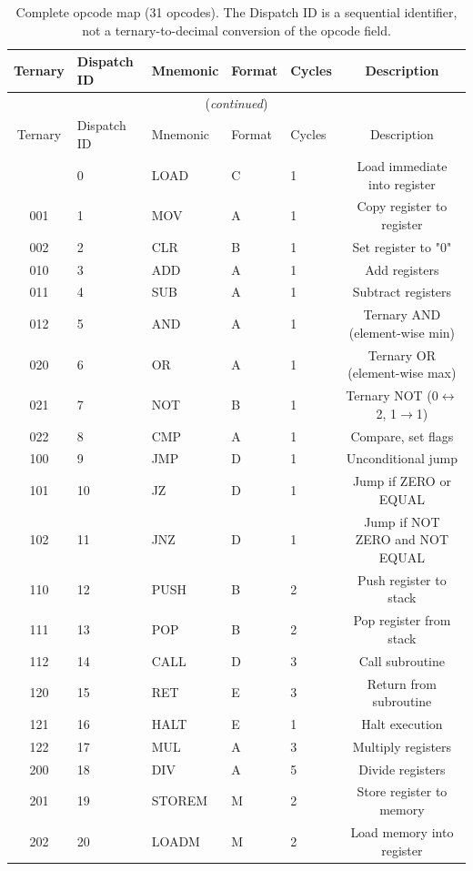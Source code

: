 \documentclass[12pt,a4paper,twoside]{book}
\theoremstyle{trinarytheorem}
\theoremstyle{trinarydefinition}
\newcommand{\code}[1]{\textsf{#1}}
\begin{document}
\begin{longtable}{cllllc}
\caption{Complete opcode map (31 opcodes). The Dispatch ID is a sequential identifier, not a ternary-to-decimal conversion of the opcode field.}
\label{tab:opcodelong} \\
\toprule
Ternary & Dispatch ID & Mnemonic & Format & Cycles & Description \\
\midrule
\endfirsthead
\multicolumn{6}{c}{(\emph{continued})} \\
\toprule
Ternary & Dispatch ID & Mnemonic & Format & Cycles & Description \\
\midrule
\endhead
\bottomrule
\endfoot
000 & 0  & LOAD    & C  & 1 & Load immediate into register \\
001 & 1  & MOV     & A  & 1 & Copy register to register \\
002 & 2  & CLR     & B  & 1 & Set register to \code{"0"} \\
010 & 3  & ADD     & A  & 1 & Add registers \\
011 & 4  & SUB     & A  & 1 & Subtract registers \\
012 & 5  & AND     & A  & 1 & Ternary AND (element-wise min) \\
020 & 6  & OR      & A  & 1 & Ternary OR (element-wise max) \\
021 & 7  & NOT     & B  & 1 & Ternary NOT (0$\leftrightarrow$2, 1$\rightarrow$1) \\
022 & 8  & CMP     & A  & 1 & Compare, set flags \\
100 & 9  & JMP     & D  & 1 & Unconditional jump \\
101 & 10 & JZ      & D  & 1 & Jump if ZERO or EQUAL \\
102 & 11 & JNZ     & D  & 1 & Jump if NOT ZERO and NOT EQUAL \\
110 & 12 & PUSH    & B  & 2 & Push register to stack \\
111 & 13 & POP     & B  & 2 & Pop register from stack \\
112 & 14 & CALL    & D  & 3 & Call subroutine \\
120 & 15 & RET     & E  & 3 & Return from subroutine \\
121 & 16 & HALT    & E  & 1 & Halt execution \\
122 & 17 & MUL     & A  & 3 & Multiply registers \\
200 & 18 & DIV     & A  & 5 & Divide registers \\
201 & 19 & STOREM  & M  & 2 & Store register to memory \\
202 & 20 & LOADM   & M  & 2 & Load memory into register \\

\end{longtable}
\end{document}
